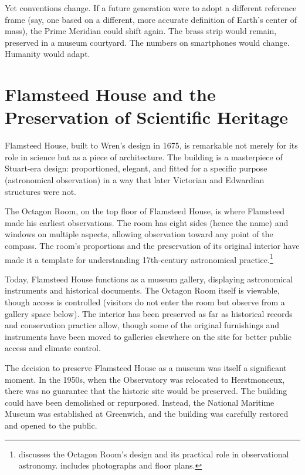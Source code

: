 Yet conventions change. If a future generation were to adopt a different reference frame (say, one based on a different, more accurate definition of Earth's center of mass), the Prime Meridian could shift again. The brass strip would remain, preserved in a museum courtyard. The numbers on smartphones would change. Humanity would adapt.

\section{Flamsteed House and the Preservation of Scientific Heritage}

Flamsteed House, built to Wren's design in 1675, is remarkable not merely for its role in science but as a piece of architecture. The building is a masterpiece of Stuart-era design: proportioned, elegant, and fitted for a specific purpose (astronomical observation) in a way that later Victorian and Edwardian structures were not.

The Octagon Room, on the top floor of Flamsteed House, is where Flamsteed made his earliest observations. The room has eight sides (hence the name) and windows on multiple aspects, allowing observation toward any point of the compass. The room's proportions and the preservation of its original interior have made it a template for understanding 17th-century astronomical practice.\footnote{\textcite{Chapman2003} discusses the Octagon Room's design and its practical role in observational astronomy. \textcite{Howse1980} includes photographs and floor plans.}

Today, Flamsteed House functions as a museum gallery, displaying astronomical instruments and historical documents. The Octagon Room itself is viewable, though access is controlled (visitors do not enter the room but observe from a gallery space below). The interior has been preserved as far as historical records and conservation practice allow, though some of the original furnishings and instruments have been moved to galleries elsewhere on the site for better public access and climate control.

The decision to preserve Flamsteed House as a museum was itself a significant moment. In the 1950s, when the Observatory was relocated to Herstmonceux, there was no guarantee that the historic site would be preserved. The building could have been demolished or repurposed. Instead, the National Maritime Museum was established at Greenwich, and the building was carefully restored and opened to the public.

